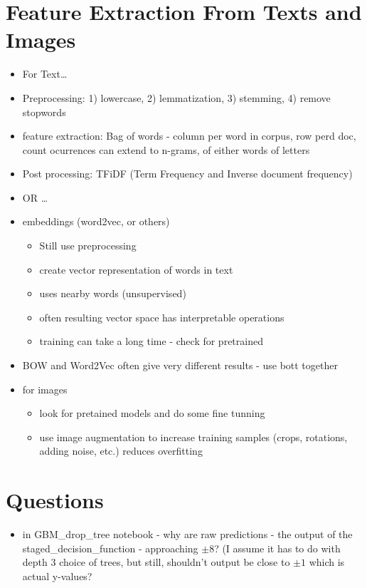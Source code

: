 \documentclass[a4paper]{report}
\begin{document}
\section{Feature Extraction From Texts and Images}
\begin{itemize}
  \item For Text\ldots
  \item Preprocessing: 1) lowercase, 2) lemmatization, 3) stemming, 4) remove stopwords
  \item feature extraction: Bag of words - column per word in corpus, row perd doc, count ocurrences
	\subitem can extend to n-grams, of either words of letters
   \item Post processing: TFiDF (Term Frequency and Inverse document frequency)
   \item OR \ldots
   \item embeddings (word2vec, or others)
     \begin{itemize}
       \item Still use preprocessing
       \item create vector representation of words in text
       \item uses nearby words (unsupervised)
       \item often resulting vector space has interpretable operations
       \item training can take a long time - check for pretrained
     \end{itemize}
   \item BOW and Word2Vec often give very different results - use bott together
   \item for images 
     \begin{itemize}
       \item look for pretained models and do some fine tunning
       \item use image augmentation to increase training samples (crops, rotations, adding noise, etc.)
	 \subitem reduces overfitting
     \end{itemize}
\end{itemize}

\section{Questions}
\begin{itemize}
  \item	in GBM\_drop\_tree notebook - why are raw predictions - the output of the staged\_decision\_function - approaching $\pm 8$? (I assume it has to do with depth 3 choice of trees, but still, shouldn't output be close to $\pm1$ which is actual y-values?
\end{itemize}
\end{document}
